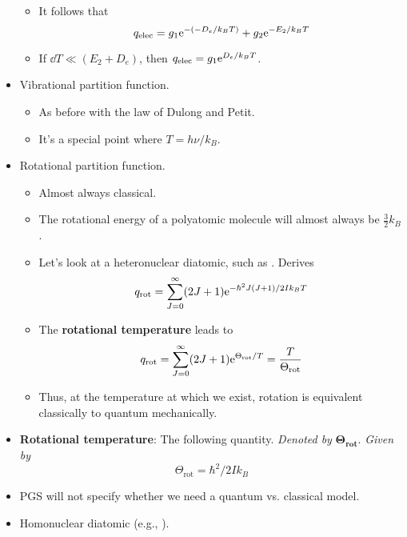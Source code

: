 \documentclass[../notes.tex]{subfiles}
\begin{document}
\begin{itemize}
\begin{itemize}
        \item It follows that
        \begin{equation*}
            q_\text{elec} = g_1\e[-(-D_e/k_BT)]+g_2\e[-E_2/k_BT]
        \end{equation*}
        \item If $\dd{T}\ll(E_2+D_e)$, then $q_\text{elec}=g_1\e[D_e/k_BT]$.
    \end{itemize}
    \item Vibrational partition function.
    \begin{itemize}
        \item As before with the law of Dulong and Petit.
        \item It's a special point where $T=h\nu/k_B$.
    \end{itemize}
    \item Rotational partition function.
    \begin{itemize}
        \item Almost always classical.
        \item The rotational energy of a polyatomic molecule will almost always be $\frac{3}{2}k_B$.
        \item Let's look at a heteronuclear diatomic, such as . Derives
        \begin{equation*}
            q_\text{rot} = \sum_{J=0}^\infty(2J+1)\e[-\hbar^2J(J+1)/2Ik_BT]
        \end{equation*}
        \item The \textbf{rotational temperature} leads to
        \begin{equation*}
            q_\text{rot} = \sum_{J=0}^\infty(2J+1)\e[\Theta_\text{rot}/T] = \frac{T}{\Theta_\text{rot}}
        \end{equation*}
        \item Thus, at the temperature at which we exist, rotation is equivalent classically to quantum mechanically.
    \end{itemize}
    \item \textbf{Rotational temperature}: The following quantity. \emph{Denoted by} $\bm{\Theta_\textbf{rot}}$. \emph{Given by}
    \begin{equation*}
        \Theta_\text{rot} = \hbar^2/2Ik_B
    \end{equation*}
    \item PGS will not specify whether we need a quantum vs. classical model.
    \item Homonuclear diatomic (e.g., ).

\end{itemize}
\end{document}
